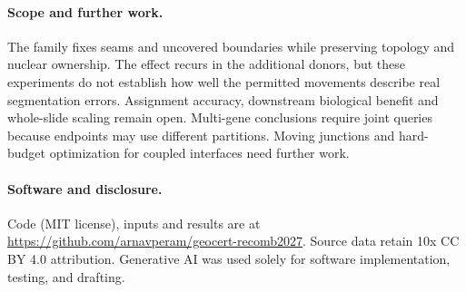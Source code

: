 \documentclass[10pt,letterpaper]{article}
\begin{document}
\paragraph{Scope and further work.}
The family fixes seams and uncovered boundaries while preserving topology and nuclear ownership. The effect recurs in the additional donors, but these experiments do not establish how well the permitted movements describe real segmentation errors. Assignment accuracy, downstream biological benefit and whole-slide scaling remain open. Multi-gene conclusions require joint queries because endpoints may use different partitions. Moving junctions and hard-budget optimization for coupled interfaces need further work.

\paragraph{Software and disclosure.}
Code (MIT license), inputs and results are at \url{https://github.com/arnavperam/geocert-recomb2027}. Source data retain 10x CC BY 4.0 attribution. Generative AI was used solely for software implementation, testing, and drafting.

\clearpage

\end{document}
